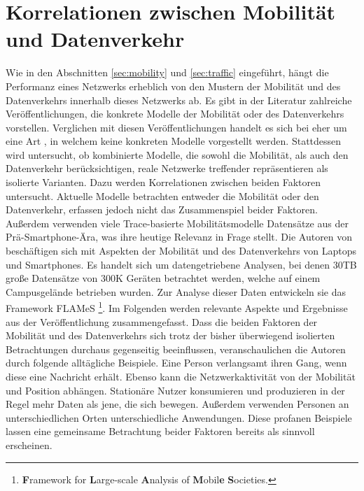 \documentclass[12pt, a4paper]{article}
\begin{document}
\section{Korrelationen zwischen Mobilität und Datenverkehr}
\label{sec:correlations}

Wie in den Abschnitten \ref{sec:mobility} und \ref{sec:traffic} eingeführt, hängt die Performanz eines
Netzwerks erheblich von den Mustern der Mobilität und des Datenverkehrs innerhalb dieses Netzwerks ab.
Es gibt in der Literatur zahlreiche Veröffentlichungen, die konkrete Modelle der Mobilität oder des Datenverkehrs
vorstellen. Verglichen mit diesen Veröffentlichungen handelt es sich bei \cite{Alipour2018} eher um eine Art 
, in welchem keine konkreten Modelle vorgestellt werden. Stattdessen wird untersucht, 
ob kombinierte Modelle, die sowohl die Mobilität, als auch den Datenverkehr berücksichtigen, reale Netzwerke 
treffender repräsentieren als isolierte Varianten. Dazu werden Korrelationen zwischen beiden Faktoren untersucht.\newline
Aktuelle Modelle betrachten entweder die Mobilität oder den Datenverkehr, erfassen jedoch nicht das Zusammenspiel beider Faktoren.
Außerdem verwenden viele Trace-basierte Mobilitätsmodelle Datensätze aus der Prä-Smartphone-Ära,
was ihre heutige Relevanz in Frage stellt. \cite{Alipour2018}
Die Autoren von \cite{Alipour2018} beschäftigen sich mit Aspekten der Mobilität und des Datenverkehrs von Laptops und Smartphones.
Es handelt sich um datengetriebene Analysen, bei denen $30$\textsc{TB} große Datensätze von $300$\textsc{K} Geräten betrachtet werden,
welche auf einem Campusgelände betrieben wurden. Zur Analyse dieser Daten entwickeln sie das Framework FLAMeS 
\footnote{\textbf{F}ramework for \textbf{L}arge-scale \textbf{A}nalysis of \textbf{M}obil\textbf{e} \textbf{S}ocieties.}.
Im Folgenden werden relevante Aspekte und Ergebnisse aus der Veröffentlichung zusammengefasst.\newline
Dass die beiden Faktoren der Mobilität und des Datenverkehrs sich trotz der bisher überwiegend isolierten Betrachtungen
durchaus gegenseitig beeinflussen, veranschaulichen die Autoren durch folgende alltägliche Beispiele. 
Eine Person verlangsamt ihren Gang, wenn diese eine Nachricht erhält. Ebenso kann die Netzwerkaktivität von der
Mobilität und Position abhängen. Stationäre Nutzer konsumieren und produzieren in der Regel mehr Daten als jene, 
die sich bewegen. Außerdem verwenden Personen an unterschiedlichen Orten unterschiedliche Anwendungen.
Diese profanen Beispiele lassen eine gemeinsame Betrachtung beider Faktoren bereits als sinnvoll erscheinen.
\end{document}
